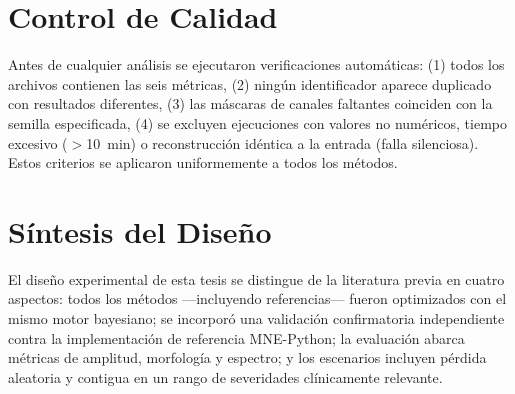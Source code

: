 \section{Control de Calidad}

Antes de cualquier análisis se ejecutaron verificaciones automáticas: (1) todos los archivos contienen las seis métricas, (2) ningún identificador aparece duplicado con resultados diferentes, (3) las máscaras de canales faltantes coinciden con la semilla especificada, (4) se excluyen ejecuciones con valores no numéricos, tiempo excesivo ($>$10~min) o reconstrucción idéntica a la entrada (falla silenciosa). Estos criterios se aplicaron uniformemente a todos los métodos.

\section{Síntesis del Diseño}

El diseño experimental de esta tesis se distingue de la literatura previa en cuatro aspectos: todos los métodos —incluyendo referencias— fueron optimizados con el mismo motor bayesiano; se incorporó una validación confirmatoria independiente contra la implementación de referencia MNE-Python; la evaluación abarca métricas de amplitud, morfología y espectro; y los escenarios incluyen pérdida aleatoria y contigua en un rango de severidades clínicamente relevante.